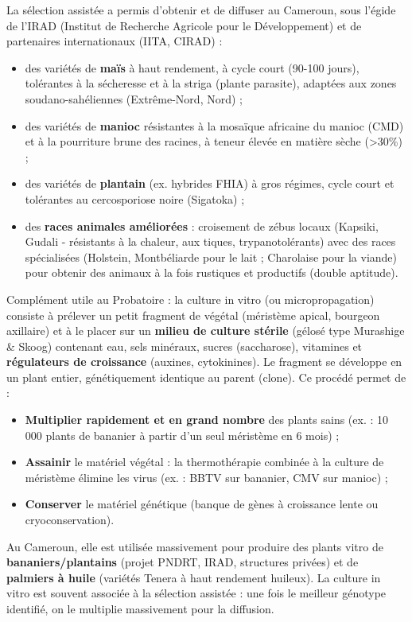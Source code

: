 \documentclass[11pt]{article}
\newcommand{\cle}[1]{{\popxbold\color{popdark}#1}}
\begin{document}
\begin{exemplebox}
La sélection assistée a permis d'obtenir et de diffuser au Cameroun, sous l'égide de l'IRAD (Institut de Recherche Agricole pour le Développement) et de partenaires internationaux (IITA, CIRAD) :
\begin{itemize}
\item des variétés de \textbf{maïs} à haut rendement, à cycle court (90-100 jours), tolérantes à la sécheresse et à la striga (plante parasite), adaptées aux zones soudano-sahéliennes (Extrême-Nord, Nord) ;
\item des variétés de \textbf{manioc} résistantes à la mosaïque africaine du manioc (CMD) et à la pourriture brune des racines, à teneur élevée en matière sèche (\textgreater 30\%) ;
\item des variétés de \textbf{plantain} (ex. hybrides FHIA) à gros régimes, cycle court et tolérantes au cercosporiose noire (Sigatoka) ;
\item des \textbf{races animales améliorées} : croisement de zébus locaux (Kapsiki, Gudali - résistants à la chaleur, aux tiques, trypanotolérants) avec des races spécialisées (Holstein, Montbéliarde pour le lait ; Charolaise pour la viande) pour obtenir des animaux à la fois rustiques et productifs (double aptitude).
\end{itemize}
\end{exemplebox}

\begin{savaistu}
Complément utile au Probatoire : la \cle{culture in vitro} (ou micropropagation) consiste à prélever un petit fragment de végétal (méristème apical, bourgeon axillaire) et à le placer sur un \textbf{milieu de culture stérile} (gélosé type Murashige \& Skoog) contenant eau, sels minéraux, sucres (saccharose), vitamines et \textbf{régulateurs de croissance} (auxines, cytokinines). Le fragment se développe en un plant entier, génétiquement identique au parent (clone). Ce procédé permet de :
\begin{itemize}
\item \textbf{Multiplier rapidement et en grand nombre} des plants sains (ex. : 10 000 plants de bananier à partir d'un seul méristème en 6 mois) ;
\item \textbf{Assainir} le matériel végétal : la thermothérapie combinée à la culture de méristème élimine les virus (ex. : BBTV sur bananier, CMV sur manioc) ;
\item \textbf{Conserver} le matériel génétique (banque de gènes à croissance lente ou cryoconservation).
\end{itemize}
Au Cameroun, elle est utilisée massivement pour produire des plants vitro de \textbf{bananiers/plantains} (projet PNDRT, IRAD, structures privées) et de \textbf{palmiers à huile} (variétés Tenera à haut rendement huileux). La culture in vitro est souvent associée à la sélection assistée : une fois le meilleur génotype identifié, on le multiplie massivement pour la diffusion.
\end{savaistu}
\end{document}
